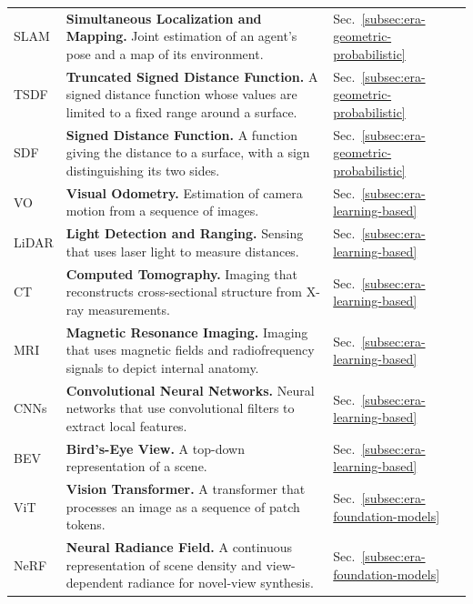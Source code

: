\begin{longtable}{lll}
    SLAM & \textbf{Simultaneous Localization and Mapping.} Joint estimation of an agent's pose and a map of its environment. & Sec.~\ref{subsec:era-geometric-probabilistic} \\
    
    TSDF & \textbf{Truncated Signed Distance Function.} A signed distance function whose values are limited to a fixed range around a surface. & Sec.~\ref{subsec:era-geometric-probabilistic} \\
    
    SDF & \textbf{Signed Distance Function.} A function giving the distance to a surface, with a sign distinguishing its two sides. & Sec.~\ref{subsec:era-geometric-probabilistic} \\
    
    VO & \textbf{Visual Odometry.} Estimation of camera motion from a sequence of images. & Sec.~\ref{subsec:era-learning-based} \\
    
    LiDAR & \textbf{Light Detection and Ranging.} Sensing that uses laser light to measure distances. & Sec.~\ref{subsec:era-learning-based} \\
    
    CT & \textbf{Computed Tomography.} Imaging that reconstructs cross-sectional structure from X-ray measurements. & Sec.~\ref{subsec:era-learning-based} \\
    
    MRI & \textbf{Magnetic Resonance Imaging.} Imaging that uses magnetic fields and radiofrequency signals to depict internal anatomy. & Sec.~\ref{subsec:era-learning-based} \\
    
    CNNs & \textbf{Convolutional Neural Networks.} Neural networks that use convolutional filters to extract local features. & Sec.~\ref{subsec:era-learning-based} \\
    
    BEV & \textbf{Bird's-Eye View.} A top-down representation of a scene. & Sec.~\ref{subsec:era-learning-based} \\
    
    ViT & \textbf{Vision Transformer.} A transformer that processes an image as a sequence of patch tokens. & Sec.~\ref{subsec:era-foundation-models} \\
    
    NeRF & \textbf{Neural Radiance Field.} A continuous representation of scene density and view-dependent radiance for novel-view synthesis. & Sec.~\ref{subsec:era-foundation-models} \\
    

\end{longtable}
